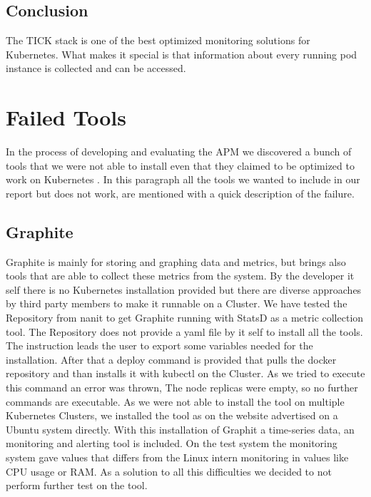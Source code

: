 \subsection{Conclusion}
The TICK stack is one of the best optimized monitoring solutions for Kubernetes. What makes it special is that information about every running pod instance is collected and can be accessed.



\section{Failed Tools}%
In the process of developing and evaluating the APM we discovered a bunch of tools that we were not able to install even that they claimed to be optimized to work on Kubernetes .
In this paragraph all the tools we wanted to include in our report but does not work, are mentioned with a quick description of the failure.
\subsection{Graphite}
Graphite is mainly for storing and graphing data and metrics, but brings also tools that are able to collect these metrics from the system. By the developer it self there is no Kubernetes installation provided but there are diverse approaches by third party members to make it runnable on a Cluster. We have tested the Repository from nanit \cite{graphite} to get Graphite running with StatsD \cite{statsd} as a metric collection tool. The Repository does not provide a yaml file by it self to install all the tools. The instruction leads the user to export some variables needed for the installation. After that a deploy command is provided that pulls the docker repository and than installs it with kubectl on the Cluster. As we tried to execute this command an error was thrown, The node replicas were empty, so no further commands are executable. As we were not able to install the tool on multiple Kubernetes Clusters, we installed the tool as on the website advertised on a Ubuntu system directly. With this installation of Graphit a time-series data, an monitoring and alerting tool is included. On the test system the monitoring system gave values that differs from the Linux intern monitoring in values like CPU usage or RAM. As a solution to all this difficulties we decided to not perform further test on the tool.

